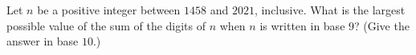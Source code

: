 Let $n$ be a positive integer between $1458$ and $2021$, inclusive. What is the largest possible value of the sum of the digits of $n$ when $n$ is written in base $9$? (Give the answer in base $10$.)
